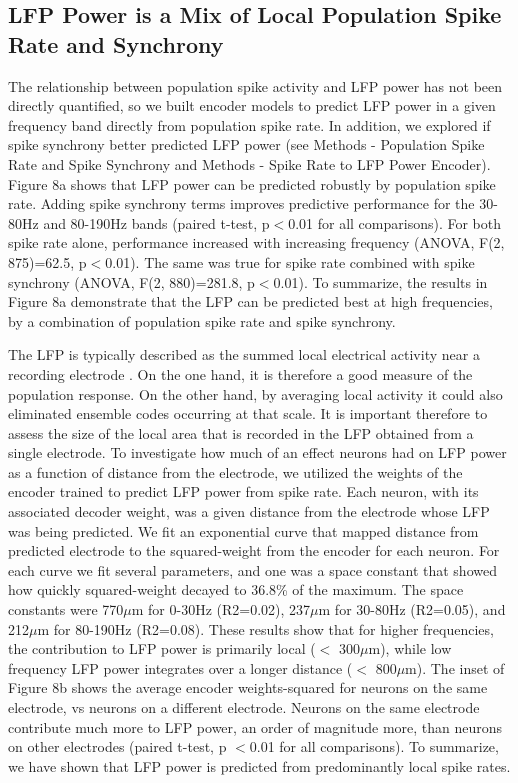 \subsection{LFP Power is a Mix of Local Population Spike Rate and Synchrony}

    The relationship between population spike activity and LFP power has not been directly quantified, so we built encoder models to predict LFP power in a given frequency band directly from population spike rate. In addition, we explored if spike synchrony better predicted LFP power (see Methods - Population Spike Rate and Spike Synchrony and Methods - Spike Rate to LFP Power Encoder). Figure 8a shows that LFP power can be predicted robustly by population spike rate. Adding spike synchrony terms improves predictive performance for the 30-80Hz and 80-190Hz bands (paired t-test, p$<$0.01 for all comparisons). For both spike rate alone, performance increased with increasing frequency (ANOVA, F(2, 875)=62.5, p$<$0.01). The same was true for spike rate combined with spike synchrony (ANOVA, F(2, 880)=281.8, p$<$0.01). To summarize, the results in Figure 8a demonstrate that the LFP can be predicted best at high frequencies, by a combination of population spike rate and spike synchrony. 

The LFP is typically described as the summed local electrical activity near a recording electrode \cite{Buzsaki2012b}. On the one hand, it is therefore a good measure of the population response. On the other hand, by averaging local activity it could also eliminated ensemble codes occurring at that scale. It is important therefore to assess the size of the local area that is recorded in the LFP obtained from a single electrode. To investigate how much of an effect neurons had on LFP power as a function of distance from the electrode, we utilized the weights of the encoder trained to predict LFP power from spike rate. Each neuron, with its associated decoder weight, was a given distance from the electrode whose LFP was being predicted. We fit an exponential curve that mapped distance from predicted electrode to the squared-weight from the encoder for each neuron. For each curve we fit several parameters, and one was a space constant that showed how quickly squared-weight decayed to 36.8\% of the maximum. The space constants were 770$\mu$m for 0-30Hz (R2=0.02), 237$\mu$m for 30-80Hz (R2=0.05), and 212$\mu$m for 80-190Hz (R2=0.08). These results show that for higher frequencies, the contribution to LFP power is primarily local ($<$ 300$\mu$m), while low frequency LFP power integrates over a longer distance ($<$ 800$\mu$m). The inset of Figure 8b shows the average encoder weights-squared for neurons on the same electrode, vs neurons on a different electrode. Neurons on the same electrode contribute much more to LFP power, an order of magnitude more, than neurons on other electrodes (paired t-test, p $<$0.01 for all comparisons). To summarize, we have shown that LFP power is predicted from predominantly local spike rates.

